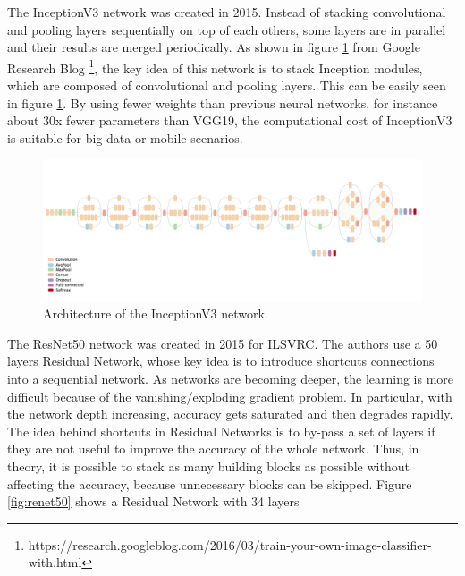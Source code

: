 The InceptionV3 network \cite{szegedy2015rethinking} was created in 2015. Instead of stacking convolutional and pooling layers sequentially on top of each others, some layers are in parallel and their results are merged periodically. As shown in figure \ref{fig:inceptionv3} from Google Research Blog \footnote{https://research.googleblog.com/2016/03/train-your-own-image-classifier-with.html}, the key idea of this network is to stack Inception modules, which are composed of convolutional and pooling layers. This can be easily seen in figure \ref{fig:inceptionv3}. By using fewer weights than previous neural networks, for instance about 30x fewer parameters than VGG19, the computational cost of InceptionV3 is suitable for big-data or mobile scenarios.

\begin{figure}[h]
	\includegraphics[width=\textwidth]{img/inceptionv3.png}
	\caption{Architecture of the InceptionV3 network.}
	\label{fig:inceptionv3}
\end{figure}

The ResNet50 network \cite{kaiming2015deepresidual} was created in 2015 for ILSVRC. The authors use a 50 layers Residual Network, whose key idea is to introduce shortcuts connections into a sequential network. As networks are becoming deeper, the learning is more difficult because of the vanishing/exploding gradient problem. In particular, with the network depth increasing, accuracy gets saturated and then degrades rapidly. The idea behind shortcuts in Residual Networks is to by-pass a set of layers if they are not useful to improve the accuracy of the whole network. Thus, in theory, it is possible to stack as many building blocks as possible without affecting the accuracy, because unnecessary blocks can be skipped. Figure \ref{fig:renet50} shows a Residual Network with 34 layers

